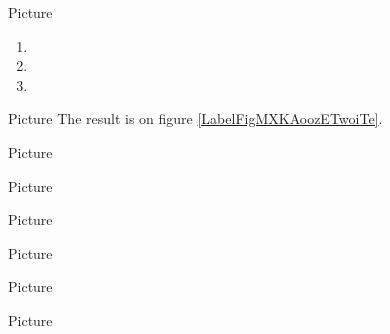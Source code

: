 Picture 
\begin{center}
   
   
   
\end{center}

\begin{enumerate}
    \item
   
   \item
   
   \item
   
\end{enumerate}

Picture 
The result is on figure \ref{LabelFigMXKAoozETwoiTe}. %
\newcommand{\CaptionFigMXKAoozETwoiTe}{An histogram.}



Picture 
\begin{center}
   
\end{center}


Picture 
\begin{center}
   
\end{center}
   

Picture 
\begin{center}
   
\end{center}
   
		

Picture 
\begin{center}
   
\end{center}
   


Picture 
\begin{center}
   
\end{center}
   

\clearpage

Picture 
\begin{center}
   
\end{center}
   

